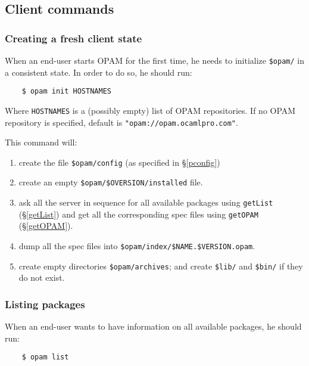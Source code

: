\documentclass[a4paper,11pt]{article}
\begin{document}
\subsection{Client commands}

\subsubsection{Creating a fresh client state}

When an end-user starts OPAM for the first time, he needs to
initialize \verb+$opam/+ in a consistent state. In order to do so, he
should run:

\begin{verbatim}
    $ opam init HOSTNAMES
\end{verbatim}

Where {\tt HOSTNAMES} is a (possibly empty) list of OPAM
repositories. If no OPAM repository is specified, default is
\verb+"opam://opam.ocamlpro.com"+.

This command will:

\begin{enumerate}

\item create the file \verb+$opam/config+ (as specified in
  \S\ref{pconfig})

\item create an empty \verb+$opam/$OVERSION/installed+ file.

\item ask all the server in sequence for all available packages using
  {\tt getList} (\S\ref{getList}) and get all the corresponding spec
  files using {\tt getOPAM} (\S\ref{getOPAM}).

\item dump all the spec files into
  \verb+$opam/index/$NAME.$VERSION.opam+.

\item create empty directories \verb+$opam/archives+; and create
  \verb+$lib/+ and \verb+$bin/+ if they do not exist.

\end{enumerate}

\subsubsection{Listing packages}

When an end-user wants to have information on all available packages,
he should run:

\begin{verbatim}
    $ opam list
\end{verbatim}
\end{document}
